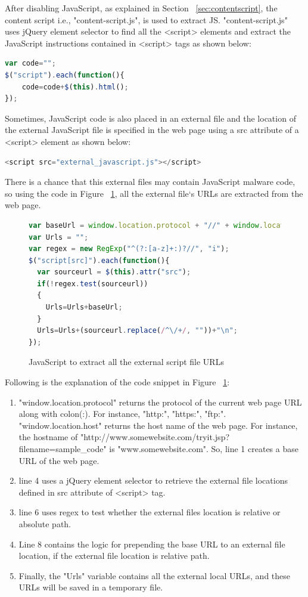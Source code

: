 After disabling JavaScript, as explained in Section ~\ref{sec:contentscript}, the content script i.e., "content-script.js", is used to extract JS. "content-script.js" uses jQuery element selector to find all the <script> elements and extract the JavaScript instructions contained in <script> tags as shown below:
\begin{lstlisting}[language=JavaScript,numbers=none,mathescape=false]
var code="";
$("script").each(function(){ 
    code=code+$(this).html();
});
\end{lstlisting}
Sometimes, JavaScript code is also placed in an external file and the location of the external JavaScript file is specified in the web page using a src attribute of a <script> element as shown below:
\begin{lstlisting}[language=JavaScript,numbers=none,mathescape=false]
<script src="external_javascript.js"></script>
\end{lstlisting}
There is a chance that this external files may contain JavaScript malware code, so using the code in Figure ~\ref{fig:extracturls}, all the external file`s URLs are extracted from the web page.
\begin{figure}[h]
  \centering
\begin{lstlisting}[frame=single,language=JavaScript,mathescape=false]
var baseUrl = window.location.protocol + "//" + window.location.host + "/";
var Urls = "";
var regex = new RegExp("^(?:[a-z]+:)?//", "i");
$("script[src]").each(function(){
  var sourceurl = $(this).attr("src");
  if(!regex.test(sourceurl))
  {
    Urls=Urls+baseUrl;
  }
  Urls=Urls+(sourceurl.replace(/^\/+/, ""))+"\n";
});
\end{lstlisting}
\caption[JavaScript to extract all the external script file URLs]{JavaScript to extract all the external script file URLs}
    \label{fig:extracturls}
\end{figure}
Following is the explanation of the code snippet in Figure ~\ref{fig:extracturls}:
\begin{enumerate}
\item "window.location.protocol" returns the protocol of the current web page URL along with colon(:). For instance, "http:", "https:", "ftp:". "window.location.host" returns the host name of the web page. For instance, the hostname of "http://www.somewebsite.com/tryit.jsp?filename=sample\_code" is "www.somewebsite.com". So, line 1 creates a base URL of the web page.
\item line 4 uses a jQuery element selector to retrieve the external file locations defined in src attribute of <script> tag.
\item line 6 uses regex to test whether the external files location is relative or absolute path.
\item Line 8 contains the logic for prepending the base URL to an external file location, if the external file location is relative path.
\item Finally, the "Urls" variable contains all the external local URLs, and these URLs will be saved in a temporary file.  
\end{enumerate}


